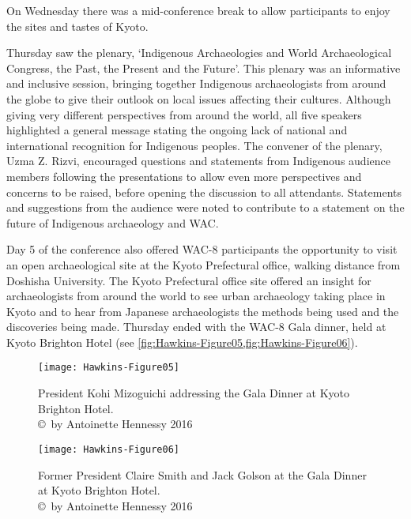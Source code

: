 On Wednesday there was a mid-conference break to allow participants to enjoy the sites and tastes of Kyoto. 

Thursday saw the plenary, \enquote*{Indigenous Archaeologies and World Archaeological Congress, the Past, the Present and the Future}. This plenary was an informative and inclusive session, bringing together Indigenous archaeologists from around the globe to give their outlook on local issues affecting their cultures. Although giving very different perspectives from around the world, all five speakers highlighted a general message stating the ongoing lack of national and international recognition for Indigenous peoples. The convener of the plenary, Uzma Z. Rizvi, encouraged questions and statements from Indigenous audience members following the presentations to allow even more perspectives and concerns to be raised, before opening the discussion to all attendants. Statements and suggestions from the audience were noted to contribute to a statement on the future of Indigenous archaeology and WAC.  

Day 5 of the conference also offered WAC-8 participants the opportunity to visit an open archaeological site at the Kyoto Prefectural office, walking distance from Doshisha University. The Kyoto Prefectural office site offered an insight for archaeologists from around the world to see urban archaeology taking place in Kyoto and to hear from Japanese archaeologists the methods being used and the discoveries being made. Thursday ended with the WAC-8 Gala dinner, held at Kyoto Brighton Hotel (see \cref{fig:Hawkins-Figure05,fig:Hawkins-Figure06}). 

\begin{figure}[!tb] %
	\texttt{[image: Hawkins-Figure05]}
	\caption{President Kohi Mizoguichi addressing the Gala Dinner at Kyoto Brighton Hotel. 
		{\normalfont\scriptsize \\ \copyright\ by Antoinette Hennessy 2016}}
	\label{fig:Hawkins-Figure05}
\end{figure}

\begin{figure}[!tb] %
	\texttt{[image: Hawkins-Figure06]}
	\caption{Former President Claire Smith and Jack Golson at the Gala Dinner at Kyoto Brighton Hotel. 
		{\normalfont\scriptsize \\ \copyright\ by Antoinette Hennessy 2016}}
	\label{fig:Hawkins-Figure06}
\end{figure}

